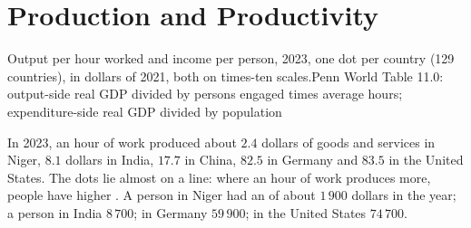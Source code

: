 \chapter{Production and Productivity}\label{ch:g8:production-and-productivity}

\begin{openingchart}{Output per hour worked and income per person, 2023, one dot per
country (129 countries), in dollars of 2021, both on times-ten scales.}{Penn World Table
11.0: output-side real GDP divided by persons engaged times average hours; expenditure-side
real GDP divided by population}
\end{openingchart}

In 2023, an hour of work produced about $2.4$ dollars of goods and services in Niger, $8.1$
dollars in India, $17.7$ in China, $82.5$ in Germany and $83.5$ in the United States. The
dots lie almost on a line: where an hour of work produces more, people have higher .
A person in Niger had an  of about $1\,900$ dollars in the year; a person in India
$8\,700$; in Germany $59\,900$; in the United States $74\,700$.

